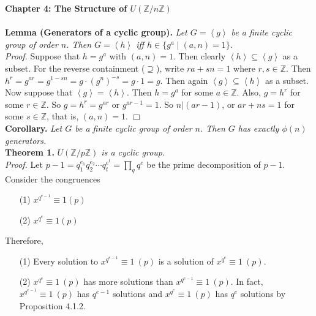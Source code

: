 \documentclass{article}
\begin{document}
\textbf{\Large Chapter 4: The Structure of $U(\mathbb{Z}/n\mathbb{Z})$} \\\\



\textbf{Lemma (Generators of a cyclic group).} \emph{Let $G = \left \langle g \right \rangle$
be a finite cyclic group of order $n$. Then $G = \left \langle h \right \rangle$ iff
$h \in \{ g^a \mid (a, n) = 1 \}$.} \\

\emph{Proof.}
Suppose that $h = g^a$ with $(a, n) = 1$. Then clearly $\left \langle h \right \rangle \subseteq
\left \langle g \right \rangle$ as a subset. For the reverse containment ($\supseteq$),
write $ra + sn = 1$ where $r, s \in \mathbb{Z}$. Then
$h^r = g^{ar} = g^{1 - sn} = g \cdot (g^n)^{-s} = g \cdot 1 = g$. Then again
$\left \langle g \right \rangle \subseteq \left \langle h \right \rangle$ as a subset. \\

Now suppose that $\left \langle g \right \rangle = \left \langle h \right \rangle$.
Then $h = g^a$ for some $a \in \mathbb{Z}$. Also, $g = h^r$ for some $r \in \mathbb{Z}$.
So $g = h^r = g^{ar}$ or $g^{ar - 1} = 1$. So $n | (ar - 1)$, or
$ar + ns = 1$ for some $s \in \mathbb{Z}$, that is, $(a, n) = 1$.
$\Box$ \\

\textbf{Corollary.} \emph{Let $G$ be a finite cyclic group of order $n$.
Then $G$ has exactly $\phi(n)$ generators.} \\

\textbf{Theorem 1.} \emph{$U(\mathbb{Z}/p\mathbb{Z})$ is a cyclic group.} \\

\emph{Proof.}
Let $p - 1 = q_1^{e_1} q_2^{e_2} \cdots q_t^{e^t} = \prod_{q} q^e$ be the prime
decomposition of $p - 1$. Consider the congruences

\begin{enumerate}
\item[(1)]
$x^{q^{e-1}} \equiv 1 (p)$
\item[(2)]
$x^{q^{e}} \equiv 1 (p)$
\end{enumerate}

Therefore,

\begin{enumerate}
\item[(1)]
Every solution to $x^{q^{e-1}} \equiv 1 \: (p)$ is a solution of $x^{q^{e}} \equiv 1 \: (p)$.
\item[(2)]
$x^{q^{e}} \equiv 1 \: (p)$ has more solutions than $x^{q^{e-1}} \equiv 1 \: (p)$.
In fact, $x^{q^{e-1}} \equiv 1 \: (p)$ has $q^{e-1}$ solutions and $x^{q^{e}} \equiv 1 \: (p)$
has $q^{e}$ solutions by Proposition 4.1.2.
\end{enumerate}
\end{document}
